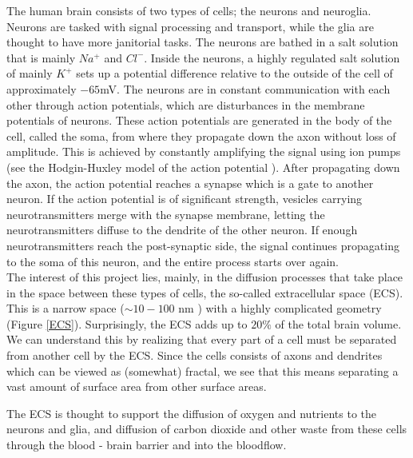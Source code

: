 The human brain consists of two types of cells; the neurons and neuroglia. 
Neurons are tasked with signal processing and transport, while the glia are thought to have more janitorial tasks. 
The neurons are bathed in a salt solution that is mainly $Na^+$ and $Cl^-$. 
Inside the neurons, a highly regulated salt solution of mainly $K^+$ sets up a potential difference relative to the outside of the cell of approximately $-65$mV.
The neurons are in constant communication with each other through action potentials, which are disturbances in the membrane potentials of neurons. 
These action potentials are generated in the body of the cell, called the soma, from where they propagate down the axon without loss of amplitude. 
This is achieved by constantly amplifying the signal using ion pumps (see the Hodgin-Huxley model of the action potential \cite{sterratt2011principles}).
After propagating down the axon, the action potential reaches a synapse which is a gate to another neuron. 
If the action potential is of significant strength, vesicles carrying neurotransmitters merge with the synapse membrane, letting the neurotransmitters diffuse to the dendrite of the other neuron. 
If enough neurotransmitters reach the post-synaptic side, the signal continues propagating to the soma of this neuron, and the entire process starts over again. \\
The interest of this project lies, mainly, in the diffusion processes that take place in the space between these types of cells, the so-called extracellular space (ECS). 
This is a narrow space ($\sim 10-100$ nm \cite{nicholson2001diffusion}) with a highly complicated geometry (Figure \ref{ECS}). 
Surprisingly, the ECS adds up to $20\%$ of the total brain volume. 
We can understand this by realizing that every part of a cell must be separated from another cell by the ECS. 
Since the cells consists of axons and dendrites which can be viewed as (somewhat) fractal, we see that this means separating a vast amount of surface area from other surface areas.

The ECS is thought to support the diffusion of oxygen and nutrients to the neurons and glia, and diffusion of carbon dioxide and other waste from these cells through the blood - brain barrier and into the bloodflow. 



